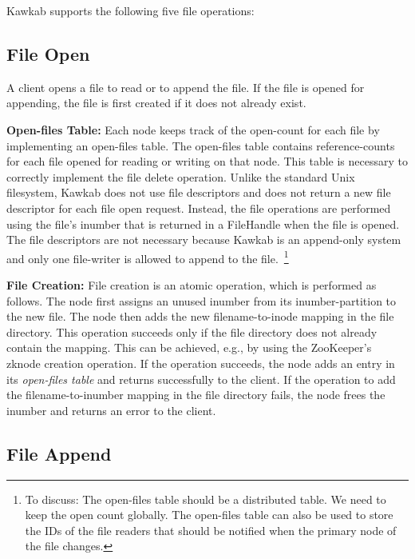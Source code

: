 \documentclass[]{article}
\newcommand{\subtopic}[1]{\vspace{1.5pt} \noindent \textbf{#1}}
\newcommand{\hl}[1]{\textcolor{hlcolor}{#1}}
\begin{document}
Kawkab supports the following five file operations:

\subsection{File Open}

A client opens a file to read or to append the file. If the file is opened for
appending, the file is first created if it does not already exist. 

\subtopic{Open-files Table:} Each node keeps track of the open-count for each
file by implementing an open-files table.  The open-files table contains
reference-counts for each file opened for reading or writing on that node.
This table is necessary to correctly implement the file delete operation.
Unlike the standard Unix filesystem, Kawkab does not use file descriptors and
does not return a new file descriptor for each file open request.  Instead, the
file operations are performed using the file's inumber that is returned in a
FileHandle when the file is opened.  The file descriptors are not necessary
because Kawkab is an append-only system and only one file-writer is allowed to
append to the file.~\footnote{\hl{To discuss: The open-files table should be a
distributed table. We need to keep the open count globally. The open-files
table can also be used to store the IDs of the file readers that should be
notified when the primary node of the file changes.}}


\subtopic{File Creation:} File creation is an atomic operation, which is
performed as follows.
The node first assigns an unused inumber from its inumber-partition to the new file.  The
node then adds the new filename-to-inode mapping in the file directory.  This
operation succeeds only if the file directory does not already contain the
mapping. This can be achieved, e.g., by using the ZooKeeper's zknode creation
operation.  If the operation succeeds, the node adds an entry in its
\textit{open-files table} and returns successfully to the client.  If the
operation to add the filename-to-inumber mapping in the file directory fails,
the node frees the inumber and returns an error to the client.  


\subsection{File Append}
\end{document}
